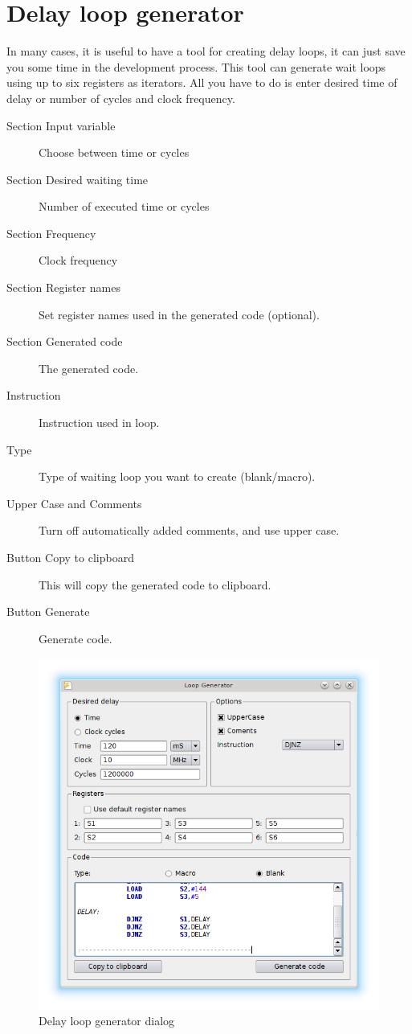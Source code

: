 \clearpage
\section{Delay loop generator}
    In many cases, it is useful to have a tool for creating delay loops, it can just save you some time in the
    development process. This tool can generate wait loops using up to six registers as iterators. All you have to do is
    enter desired time of delay or number of cycles and clock frequency.

    \begin{description}
        \item[Section Input variable] Choose between time or cycles
        \item[Section Desired waiting time] Number of executed time or cycles
        \item[Section Frequency] Clock frequency
        \item[Section Register names] Set register names used in the generated code (optional).
        \item[Section Generated code] The generated code.
        \item[Instruction] Instruction used in loop.
        \item[Type] Type of waiting loop you want to create (blank/macro).
        \item[Upper Case and Comments]  Turn off automatically added comments, and use upper case.
        \item[Button Copy to clipboard] This will copy the generated code to clipboard.
        \item[Button Generate] Generate code.
    \end{description}

    \begin{figure}[h]
        \centering{}
        \includegraphics[width=.6\textwidth]{img/loop_gen.png}
        \caption{Delay loop generator dialog}
    \end{figure}

